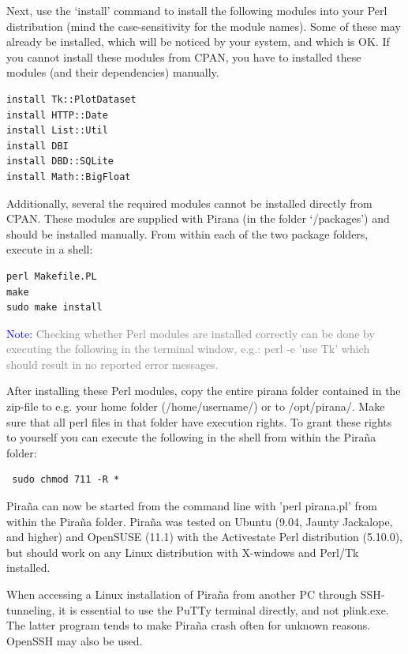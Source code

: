 \documentclass[a4,11pt]{report} \usepackage[pdftex]{graphicx}
\begin{document}
\noindent Next, use the `install' command to install the following
modules into your Perl distribution (mind the case-sensitivity for the
module names). Some of these may already be installed, which will be
noticed by your system, and which is OK. If you cannot install these
modules from CPAN, you have to installed these modules (and their
dependencies) manually.

\begin{verbatim}
install Tk::PlotDataset
install HTTP::Date
install List::Util
install DBI
install DBD::SQLite
install Math::BigFloat
\end{verbatim}

\noindent Additionally, several the required modules cannot be installed
directly from CPAN. These modules are supplied with Pirana (in the
folder `/packages') and should be installed manually. From within each
of the two package folders, execute in a shell:

\begin{verbatim}
perl Makefile.PL
make
sudo make install
\end{verbatim}

\vspace{8pt}
\noindent\scriptsize{\textcolor{Blue}{Note:} \textcolor{Grey}{Checking
whether Perl modules are installed correctly can be done by executing the
following in the terminal window, e.g.: perl -e 'use Tk' which should
result in no reported error messages.\\ } } \normalsize

\noindent After installing these Perl modules, copy the entire pirana
folder contained in the zip-file to e.g. your home folder
(/home/username/) or to /opt/pirana/. Make sure that all perl files in that folder have
execution rights. To grant these rights to yourself you can execute
the following in the shell from within the Pira\~na folder:

\begin{verbatim} sudo chmod 711 -R *
\end{verbatim}

\noindent Pira\~na can now be started from the command line with 'perl
pirana.pl' from within the Pira\~na folder. Pira\~na was tested on
Ubuntu (9.04, Jaunty Jackalope, and higher) and OpenSUSE (11.1) with
the Activestate Perl distribution (5.10.0), but should work on any
Linux distribution with X-windows and Perl/Tk installed.

When accessing a Linux installation of Pira\~na from another PC through
SSH-tunneling, it is essential to use the PuTTy terminal directly, and not
plink.exe. The latter program tends to make Pira\~na crash often for
unknown reasons. OpenSSH may also be used.
\end{document}
